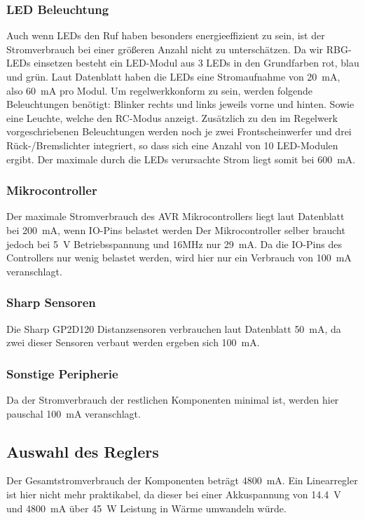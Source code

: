 \subsubsection{LED Beleuchtung}
Auch wenn LEDs den Ruf haben besonders energieeffizient zu sein, ist der Stromverbrauch bei einer größeren Anzahl nicht zu
unterschätzen. Da wir RBG-LEDs einsetzen besteht ein LED-Modul aus 3 LEDs in den Grundfarben rot, blau und grün.
Laut Datenblatt \cite{ds-WS2812} haben die LEDs eine Stromaufnahme von \SI{20}{\milli\ampere}, also \SI{60}{\milli\ampere} pro Modul.
Um regelwerkkonform zu sein, werden folgende Beleuchtungen benötigt: Blinker rechts und links jeweils vorne und hinten.
Sowie eine Leuchte, welche den RC-Modus anzeigt. Zusätzlich zu den im Regelwerk vorgeschriebenen Beleuchtungen werden noch je
zwei Frontscheinwerfer und drei Rück-/Bremslichter integriert, so dass sich eine Anzahl von 10 LED-Modulen ergibt.
Der maximale durch die LEDs verursachte Strom liegt somit bei \SI{600}{\milli\ampere}. 

\subsubsection{Mikrocontroller}
Der maximale Stromverbrauch des AVR Mikrocontrollers liegt laut Datenblatt\cite{ds-at90can} bei \SI{200}{\milli\ampere}, wenn IO-Pins belastet werden
Der Mikrocontroller selber braucht jedoch bei \SI{5}{\volt} Betriebsspannung und 16MHz nur \SI{29}{\milli\ampere}. Da die IO-Pins des Controllers nur wenig belastet werden,
wird hier nur ein Verbrauch von \SI{100}{\milli\ampere} veranschlagt.

\subsubsection{Sharp Sensoren}
Die Sharp GP2D120 Distanzsensoren verbrauchen laut Datenblatt \cite{ds-sharp-GP2D120} \SI{50}{\milli\ampere}, da zwei dieser Sensoren verbaut werden ergeben sich \SI{100}{\milli\ampere}.

\subsubsection{Sonstige Peripherie}
Da der Stromverbrauch der restlichen Komponenten minimal ist, werden hier pauschal \SI{100}{\milli\ampere} veranschlagt.

\subsection{Auswahl des Reglers}
Der Gesamtstromverbrauch der Komponenten beträgt \SI{4800}{\milli\ampere}. Ein Linearregler ist hier nicht mehr praktikabel, da dieser bei einer Akkuspannung von \SI{14,4}{\volt} und \SI{4800}{\milli\ampere} über \SI{45}{\watt} Leistung in Wärme umwandeln würde.

